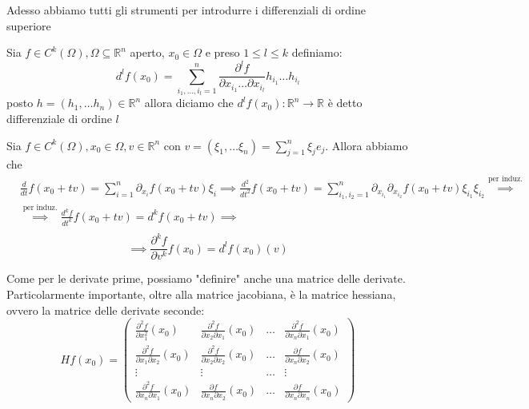 \documentclass[openany, italian]{book}
\begin{document}
Adesso abbiamo tutti gli strumenti per introdurre i differenziali di ordine superiore
\begin{definition}
	Sia $f \in C^k(\Omega), \Omega \subseteq \mathbb{R}^n$ aperto, $x_0 \in \Omega$ e preso $1 \leq l \leq k$ definiamo:
	$$
	d^l f(x_0) = \sum_{i_1, \ldots, i_l = 1}^n \frac{\partial^l f}{\partial x_{i_1} \ldots \partial x_{i_l}} h_{i_1} \ldots h_{i_l}
	$$
	posto $h=(h_1, \ldots h_n) \in \mathbb{R}^n$ allora diciamo che $d^l f(x_0):\mathbb{R}^n \to \mathbb{R}$ è detto differenziale di ordine $l$
\end{definition}
\begin{remark}
Sia $f \in C^k (\Omega), x_0 \in \Omega, v \in \mathbb{R}^n$ con $v = (\xi_1, \ldots \xi_n) = \sum_{j=1}^n \xi_j e_j$. Allora abbiamo che
\begin{align*}
&\frac{d}{dt} f(x_0 + tv) = \sum_{i=1}^n \partial_{x_i} f (x_0 + tv) \xi_i \implies \frac{d^2}{dt^2} f(x_0 + tv) = \sum_{i_1, i_2 = 1}^{n} \partial_{x_{i_1}} \partial_{x_{i_2}} f(x_0 + tv) \xi_{i_1} \xi_{i_2}\stackrel{\text{per induz.}}{\implies} \\ &\stackrel{\text{per induz.}}{\implies} \frac{d^k f}{dt^k} f(x_0 + tv) = d^k f(x_0 + tv) \implies \\
\end{align*}
\begin{equation}
\implies \boxed{\frac{\partial^k f}{\partial v^k} f(x_0) = d^l f(x_0)(v)}
\end{equation}
\end{remark}
Come per le derivate prime, possiamo "definire" anche una matrice delle derivate. Particolarmente importante, oltre alla matrice jacobiana, è la matrice hessiana, ovvero la matrice delle derivate seconde:
\begin{equation}
Hf(x_0) = \begin{pmatrix}
\frac{\partial^2 f}{\partial x_1^2}(x_0) & \frac{\partial^2 f}{\partial x_2 \partial x_1}(x_0) & \ldots & \frac{\partial^2 f}{\partial x_n \partial x_1}(x_0) \\
\frac{\partial^2 f}{\partial x_1 \partial x_2}(x_0) & \frac{\partial^2 f}{\partial x_2 \partial x_2}(x_0) & \ldots & \frac{\partial f}{\partial x_n \partial x_2}(x_0) \\
\vdots & \vdots & \ldots & \vdots \\
\frac{\partial^2 f}{\partial x_n \partial x_1}(x_0) & \frac{\partial f}{\partial x_n \partial x_2}(x_0) & \ldots & \frac{\partial f}{\partial x_n \partial x_n}(x_0)
\end{pmatrix}
\end{equation}
\end{document}
